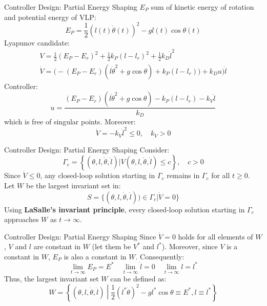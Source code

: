 \documentclass[10pt]{beamer}
\begin{document}
  \begin{frame}{Controller Design: Partial Energy Shaping}
    $E_P$ sum of kinetic energy of rotation and potential energy of VLP:
    \begin{equation*}
      E_P = \frac{1}{2}(l(t)\dot{\theta}(t))^2-gl(t)\cos\theta(t)
    \end{equation*}
    Lyapunov candidate:
    \begin{gather*}
      V = \frac{1}{2}(E_P-E_r)^2+\frac{1}{2}k_P(l-l_r)^2+
        \frac{1}{2}k_D\dot{l}^2 \\ 
      \dot{V} = \big(-(E_P-E_r)(l\dot{\theta}^2+g\cos\theta)+k_P(l-l_r)\big)
        + k_D u) \dot{l}
    \end{gather*}
    Controller:
    \begin{equation*}
      u = \frac{(E_P-E_r)(l\dot{\theta}^2+g\cos\theta)-k_P(l-l_r)
        -k_V\dot{l}}{k_D}
    \end{equation*}
    which is free of singular points. Moreover:
    \begin{equation*}
      \dot{V} = -k_V \dot{l}^2 \le 0, \quad k_V > 0
    \end{equation*}
  \end{frame}

  \begin{frame}{Controller Design: Partial Energy Shaping}
    Consider:
    \begin{equation*}
      \Gamma_c = \left\{(\theta,l,\dot{\theta},\dot{l})|
        V(\theta,l,\dot{\theta},\dot{l}) \le c\right\}, \quad c > 0
    \end{equation*}
    Since $\dot{V} \le 0$, any closed-loop solution starting in $\Gamma_c$
    remains in $\Gamma_c$ for all $t \ge 0$.
    Let $W$ be the largest invariant set in:
    \begin{equation*}
      S = \{(\theta,l,\dot{\theta},\dot{l})) \in \Gamma_c|\dot{V}=0\}
    \end{equation*}
    Using \textbf{LaSalle's invariant principle}, every closed-loop
    solution starting in $\Gamma_c$ approaches $W$ as $t \to \infty$.
  \end{frame}

  \begin{frame}{Controller Design: Partial Energy Shaping}
    Since $\dot{V} = 0$ holds for all elements of $W$, $V$ and $l$
    are constant in $W$ (let them be $V^*$ and $l^*$). Moreover,
    since $V$ is a constant in $W$, $E_P$ is also a constant in $W$.
    Consequently:
    \begin{equation*}
      \lim_{t\rightarrow \infty} E_P = E^* \quad
      \lim_{t\rightarrow \infty} \dot{l} = 0 \quad
      \lim_{t\rightarrow \infty} l = l^*
    \end{equation*}     
    Thus, the largest invariant set $W$ can be defined as:
    \begin{equation*}
      W = \left\{(\theta,l,\dot{\theta},\dot{l})\middle|
        \frac{1}{2}(l^*\dot{\theta})^2-gl^*\cos\theta \equiv E^*,
        l \equiv l^*\right\}
    \end{equation*}
  \end{frame}
\end{document}
